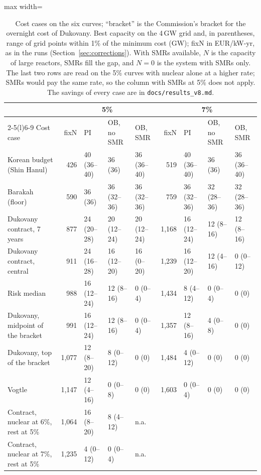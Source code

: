 \begin{table}[H]
\centering\footnotesize
\caption{Cost cases on the six curves; ``bracket'' is the Commission's bracket for the overnight cost of Dukovany. Best capacity on the 4\,GW grid and, in parentheses, range of grid points within 1\% of the minimum cost (GW); fixN in EUR/kW-yr, as in the runs (Section~\ref{sec:corrections}). With SMRs available, $N$ is the capacity of large reactors, SMRs fill the gap, and $N=0$ is the system with SMRs only. The last two rows are read on the 5\% curves with nuclear alone at a higher rate; SMRs would pay the same rate, so the column with SMRs at 5\% does not apply. The savings of every case are in \texttt{docs/results\_v8.md}.}\label{tab:allcasesN}
\begin{adjustbox}{max width=\linewidth}
\begin{tabular}{@{}lrlllrlll@{}}
\toprule
 & \multicolumn{4}{c}{5\%} & \multicolumn{4}{c}{7\%}\\
\cmidrule(lr){2-5}\cmidrule(l){6-9}
Cost case & fixN & PI & OB, no SMR & OB, SMR & fixN & PI & OB, no SMR & OB, SMR\\
\midrule
Korean budget (Shin Hanul) & 426 & 40 (36--40) & 36 (36) & 36 (36--40) & 519 & 40 (36--40) & 36 (36) & 36 (36--40)\\
Barakah (floor) & 590 & 36 (36) & 36 (32--36) & 36 (32--36) & 759 & 36 (32--36) & 32 (28--36) & 32 (28--36)\\
Dukovany contract, 7 years & 877 & 24 (20--28) & 20 (12--24) & 20 (12--24) & 1{,}168 & 16 (12--24) & 12 (8--16) & 12 (8--16)\\
Dukovany contract, central & 911 & 24 (16--28) & 16 (12--20) & 16 (0--20) & 1{,}239 & 16 (12--20) & 12 (4--16) & 0 (0--12)\\
Risk median & 988 & 16 (12--24) & 12 (8--16) & 0 (0--4) & 1{,}434 & 8 (4--12) & 0 (0--4) & 0 (0)\\
Dukovany, midpoint of the bracket & 991 & 16 (12--24) & 12 (8--16) & 0 (0--4) & 1{,}357 & 12 (8--16) & 4 (0--8) & 0 (0)\\
Dukovany, top of the bracket & 1{,}077 & 12 (8--20) & 8 (0--12) & 0 (0) & 1{,}484 & 4 (0--12) & 0 (0) & 0 (0)\\
Vogtle & 1{,}147 & 12 (4--16) & 0 (0--8) & 0 (0) & 1{,}603 & 0 (0--4) & 0 (0) & 0 (0)\\
\midrule
Contract, nuclear at 6\%, rest at 5\% & 1{,}064 & 16 (8--20) & 8 (4--12) & n.a. & & & & \\
Contract, nuclear at 7\%, rest at 5\% & 1{,}235 & 4 (0--12) & 0 (0--4) & n.a. & & & & \\
\bottomrule
\end{tabular}
\end{adjustbox}

\end{table}

